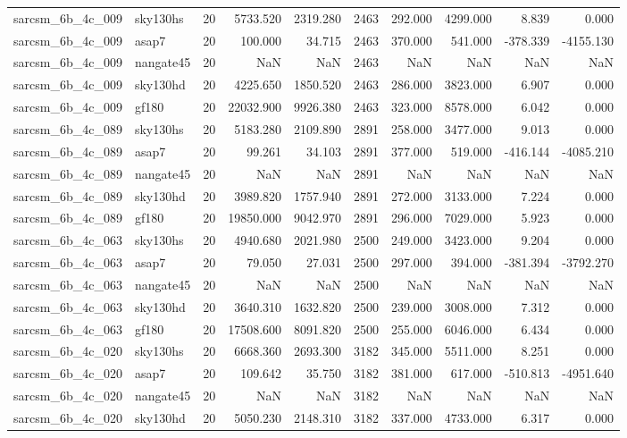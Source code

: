 \begin{tabular}{llrrrrrrrr}
sarcsm\_6b\_4c\_009 & sky130hs & 20 & 5733.520 & 2319.280 & 2463 & 292.000 & 4299.000 & 8.839 & 0.000 \\
sarcsm\_6b\_4c\_009 & asap7 & 20 & 100.000 & 34.715 & 2463 & 370.000 & 541.000 & -378.339 & -4155.130 \\
sarcsm\_6b\_4c\_009 & nangate45 & 20 & NaN & NaN & 2463 & NaN & NaN & NaN & NaN \\
sarcsm\_6b\_4c\_009 & sky130hd & 20 & 4225.650 & 1850.520 & 2463 & 286.000 & 3823.000 & 6.907 & 0.000 \\
sarcsm\_6b\_4c\_009 & gf180 & 20 & 22032.900 & 9926.380 & 2463 & 323.000 & 8578.000 & 6.042 & 0.000 \\
sarcsm\_6b\_4c\_089 & sky130hs & 20 & 5183.280 & 2109.890 & 2891 & 258.000 & 3477.000 & 9.013 & 0.000 \\
sarcsm\_6b\_4c\_089 & asap7 & 20 & 99.261 & 34.103 & 2891 & 377.000 & 519.000 & -416.144 & -4085.210 \\
sarcsm\_6b\_4c\_089 & nangate45 & 20 & NaN & NaN & 2891 & NaN & NaN & NaN & NaN \\
sarcsm\_6b\_4c\_089 & sky130hd & 20 & 3989.820 & 1757.940 & 2891 & 272.000 & 3133.000 & 7.224 & 0.000 \\
sarcsm\_6b\_4c\_089 & gf180 & 20 & 19850.000 & 9042.970 & 2891 & 296.000 & 7029.000 & 5.923 & 0.000 \\
sarcsm\_6b\_4c\_063 & sky130hs & 20 & 4940.680 & 2021.980 & 2500 & 249.000 & 3423.000 & 9.204 & 0.000 \\
sarcsm\_6b\_4c\_063 & asap7 & 20 & 79.050 & 27.031 & 2500 & 297.000 & 394.000 & -381.394 & -3792.270 \\
sarcsm\_6b\_4c\_063 & nangate45 & 20 & NaN & NaN & 2500 & NaN & NaN & NaN & NaN \\
sarcsm\_6b\_4c\_063 & sky130hd & 20 & 3640.310 & 1632.820 & 2500 & 239.000 & 3008.000 & 7.312 & 0.000 \\
sarcsm\_6b\_4c\_063 & gf180 & 20 & 17508.600 & 8091.820 & 2500 & 255.000 & 6046.000 & 6.434 & 0.000 \\
sarcsm\_6b\_4c\_020 & sky130hs & 20 & 6668.360 & 2693.300 & 3182 & 345.000 & 5511.000 & 8.251 & 0.000 \\
sarcsm\_6b\_4c\_020 & asap7 & 20 & 109.642 & 35.750 & 3182 & 381.000 & 617.000 & -510.813 & -4951.640 \\
sarcsm\_6b\_4c\_020 & nangate45 & 20 & NaN & NaN & 3182 & NaN & NaN & NaN & NaN \\
sarcsm\_6b\_4c\_020 & sky130hd & 20 & 5050.230 & 2148.310 & 3182 & 337.000 & 4733.000 & 6.317 & 0.000 \\

\end{tabular}
